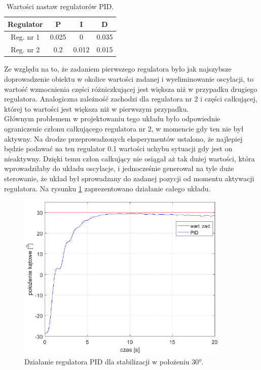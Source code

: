 \documentclass[11pt,a4paper]{article}
\begin{document}
\begin{table}[ht]
	\caption{Wartości nastaw regulatorów PID.}
	\label{nastawy_pid}
	\centering
	
	\begin{tabular}{|c|c|c|c|}
		\hline
		Regulator &P&I&D\\
		\hline
		Reg. nr 1 &0.025&   0 &  0.035\\
		\hline
		Reg. nr 2 &0.2 &0.012 &0.015\\ 
		\hline
	\end{tabular}
\end{table}

Ze względu na to, że zadaniem pierwszego regulatora było jak najszybsze doprowadzenie obiektu w okolice wartości zadanej i wyeliminowanie oscylacji, to wartość wzmocnienia części różniczkującej jest większa niż w przypadku drugiego regulatora. Analogiczna zależność zachodzi dla regulatora nr 2 i części całkującej, której to wartości jest większa niż w pierwszym przypadku. \\
Głównym problemem w projektowaniu tego układu było odpowiednie ograniczenie członu całkującego regulatora nr 2, w momencie gdy ten nie był aktywny. Na drodze przeprowadzonych eksperymentów  ustalono, że najlepiej będzie podawać na ten regulator 0.1 wartości uchybu sytuacji gdy jest on nieaktywny. Dzięki temu człon całkujący nie osiągał aż tak dużej wartości, która wprowadziłaby do układu oscylacje, i jednocześnie generował na tyle duże sterowanie, że układ był sprowadzany do zadanej pozycji od momentu aktywacji regulatora.  Na rysunku \ref{fig:PID_30} zaprezentowano działanie całego układu.

\begin{figure}[H]
	\centering
	\includegraphics[width=4in]{Figures/pid30.eps}
	\caption{Działanie regulatora PID dla stabilizacji w położeniu \ang{30}.}
	\label{fig:PID_30}
\end{figure}
\end{document}
